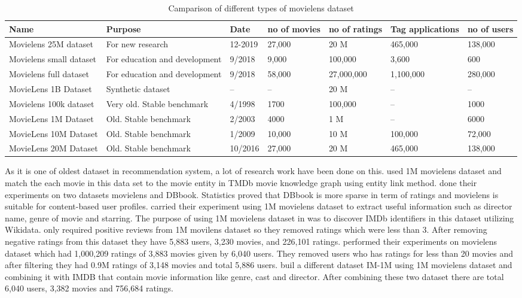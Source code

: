 \begin{table}[!htbp] 
\centering
\footnotesize
\def\arraystretch{1.4}%
\centering
\begin{tabular}{|p{3cm}|p{3cm}|p{1cm}|p{1.5cm}|p{1.5cm}|p{1.5cm}|p{1.5cm}|}
\hline
Name  & Purpose & Date & no of movies & no of ratings & Tag applications & no of users
\\
\hline 
Movielens 25M dataset & For new research & 12-2019 & 27,000 &  20 M & 465,000 & 138,000
\\
\hline 
Movielens small dataset & For education and development & 9/2018 & 9,000 &  100,000 &  3,600 & 600
\\
\hline 
Movielens full dataset & For education and development & 9/2018 & 58,000 &  27,000,000 &  1,100,000 & 280,000
\\
\hline 
MovieLens 1B Dataset & Synthetic dataset & -- & -- &  20 M &  -- & --
\\
\hline 
Movielens 100k dataset & Very old. Stable benchmark & 4/1998 & 1700 &  100,000 &  -- & 1000 
\\
\hline 
MovieLens 1M Dataset & Old. Stable benchmark & 2/2003 & 4000  &  1 M &  -- & 6000 
\\
\hline 
MovieLens 10M Dataset & Old. Stable benchmark & 1/2009 & 10,000  &  10 M & 100,000 & 72,000 
\\
\hline 
MovieLens 20M Dataset & Old. Stable benchmark & 10/2016 & 27,000  &  20 M & 465,000 & 138,000
\\
\hline
\end{tabular}

\caption{Camparison of different types of movielens dataset}
\label{table:7}
\end{table}
As it is one of oldest dataset in recommendation system, a lot of research work have been done on this.\cite{N21} used 1M movielens dataset and match the each movie in this data set to the movie entity in TMDb movie knowledge graph using entity link method. \cite{N28} done their experiments on two datasets movielens and DBbook. Statistics proved that DBbook is more sparse in term of ratings and movielens is suitable for content-based user profiles. \cite{N31} carried their experiment using 1M movielens dataset to extract useful information such as director name, genre of movie and starring. The purpose of using 1M movielens dataset in \cite{N13} was to discover IMDb identifiers in this dataset utilizing Wikidata. \cite{N14} only required positive reviews from 1M movilens dataset so they removed ratings which were less than 3. After removing negative ratings from this dataset they have 5,883 users, 3,230 movies, and 226,101 ratings. \cite{N15} performed their experiments on movielens dataset which had 1,000,209 ratings of 3,883 movies given by 6,040 users. They removed users who has ratings for less than 20 movies and after filtering they had  0.9M ratings of 3,148 movies and total 5,886 users. \cite{N17} buil a different dataset IM-1M using 1M movielens dataset and  combining it with IMDB that contain movie information like genre, cast and director. After combining these two dataset there are total 6,040 users,  3,382 movies and 756,684 ratings.

